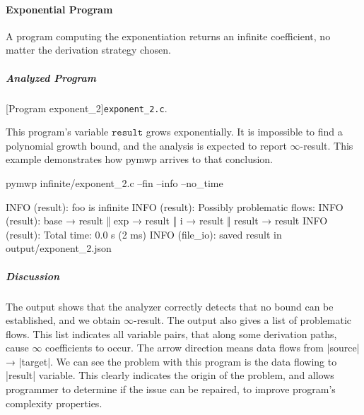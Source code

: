 \paragraph{Exponential Program}\label{exponential-program}
A program computing the exponentiation returns an infinite coefficient, no matter the derivation strategy chosen.

\subparagraph*{Analyzed Program}

\begin{center}
\begin{minipage}{\textwidth}
\captionsetup{type=lstlisting}
[Program exponent\_2]{\texttt{exponent\_2.c}.}
\label{lst:exponent2}
\end{minipage}
\end{center}

This program's variable \(\texttt{result}\) grows exponentially.
It is impossible to find a polynomial growth bound, and the analysis is expected to report \(\infty\)-result.
This example demonstrates how pymwp arrives to that conclusion.

\begin{center}
\begin{minipage}{\textwidth}
\begin{cmdlisting}[label={lst:ex2-run-cmd}]
pymwp infinite/exponent_2.c --fin --info --no_time
\end{cmdlisting}
\end{minipage}
\end{center}

\begin{center}
\begin{minipage}{\textwidth}
\begin{outlisting}[label={lst:ex2-output}]
INFO (result): foo is infinite
INFO (result): Possibly problematic flows:
INFO (result): base → result ‖ exp → result ‖ i → result ‖ result → result
INFO (result): Total time: 0.0 s (2 ms)
INFO (file_io): saved result in output/exponent_2.json
\end{outlisting}
\end{minipage}
\end{center}


\subparagraph*{Discussion}
The output shows that the analyzer correctly detects that no bound can
be established, and we obtain \(\infty\)-result.
The output also gives a list of problematic flows.
This list indicates all variable pairs, that along some derivation paths, cause \(\infty\) coefficients to occur.
The arrow direction means data flows from \pr|source| → \pr|target|.
We can see the problem with this program is the data flowing to \pr|result| variable.
This clearly indicates the origin of the problem, and allows programmer to determine if the issue can be
repaired, to improve program's complexity properties.

